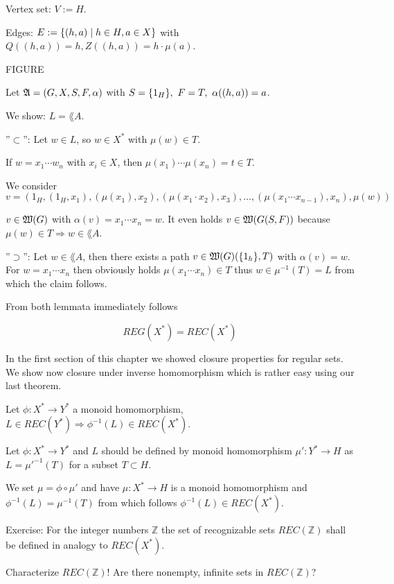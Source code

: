 Vertex set: $V := H$.

Edges: $E := \mbox{$\{(h, a) \mid h \in H, a \in X\}$}$ with $Q((h,a)) = h,
Z((h,a)) = h \cdot \mu(a)$.

FIGURE

Let $\mbox{$\mathfrak{A}$} = (G, X, S, F, \alpha)$ with $S = \mbox{$\{1_H\}$},\ F = T,\ \alpha((h,
a)) = a$.

We show: $L = \lang{A}$.

''$\subset$'': Let $w \in L$, so $w \in X^*$ with $\mu(w) \in T$.

If $w = x_1 \cdots w_n$ with $x_i \in X$, then $\mu(x_1) \cdots \mu(x_n) = t
\in T$.

We consider \[ v = (1_H, (1_H, x_1), (\mu(x_1), x_2), (\mu(x_1 \cdot x_2),
x_3), \ldots, (\mu(x_1 \cdots x_{n-1}), x_n), \mu(w)) \]

$v \in \mbox{$\mathfrak{W}(G)$}$ with $\alpha(v) = x_1 \cdots x_n = w$. It even holds $v \in
\mbox{$\mathfrak{W}(G(S, F))$}$ because $\mu(w) \in T \Rightarrow w \in \lang{A}$.

''$\supset$'': Let $w \in \lang{A}$, then there exists a path $v \in
\mbox{$\mathfrak{W}(G)$}(\mbox{$\{1_h\}$}, T)$ with $\alpha(v) = w$. For $w = x_1 \cdots x_n$
then obviously holds $\mu(x_1 \cdots x_n) \in T$ thus $w \in \mu^{-1}(T) = L$ from
which the claim follows.

From both lemmata immediately follows

\begin{theorem}
\[ REG(X^*) = REC(X^*) \]
\end{theorem}

In the first section of this chapter we showed closure properties for regular
sets. We show now closure under inverse homomorphism which is rather easy using
our last theorem.

\begin{theorem}
Let $\phi : X^* \to Y^*$ a monoid homomorphism, $L \in REC(Y^*) \Rightarrow
\phi^{-1}(L) \in REC(X^*)$.
\end{theorem}

Let $\phi : X^* \to Y^*$ and $L$ should be defined by monoid homomorphism $\mu'
: Y^* \to H$ as $L = \mu'^{-1}(T)$ for a subset $T \subset H$.

We set $\mu = \phi \circ \mu'$ and have $\mu : X^* \to H$ is a monoid
homomorphism and $\phi^{-1}(L) = \mu^{-1}(T)$ from which follows $\phi^{-1}(L)
\in REC(X^*)$.

Exercise: For the integer numbers $\mathbb{Z}$ the set of recognizable sets
$REC(\mathbb{Z})$ shall be defined in analogy to $REC(X^*)$.

Characterize $REC(\mathbb{Z})$! Are there nonempty, infinite sets in
$REC(\mathbb{Z})$?
